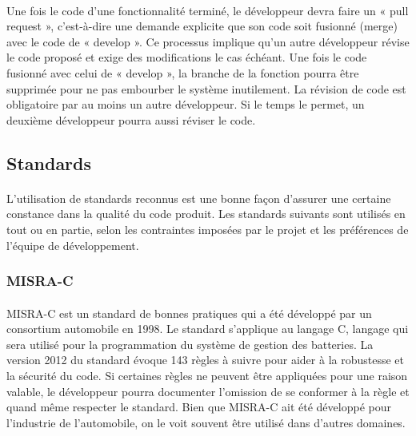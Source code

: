 		\paragraph{}
		Une fois le code d’une fonctionnalité terminé, le développeur devra faire un « pull request », c’est-à-dire une demande explicite que son code soit fusionné (merge) avec le code de « develop ». Ce processus implique qu’un autre développeur révise le code proposé et exige  des modifications le cas échéant. Une fois le code fusionné avec celui de « develop », la branche de la fonction pourra être supprimée pour ne pas embourber le système inutilement. La révision de code est obligatoire par au moins un autre développeur. Si le temps le permet, un deuxième développeur pourra aussi réviser le code.
		
	\subsection{Standards}

		\paragraph{}
		L’utilisation de standards reconnus est une bonne façon d’assurer une certaine constance dans la qualité du code produit. Les standards suivants sont utilisés en tout ou en partie, selon les contraintes imposées par le projet et les préférences de l’équipe de développement.
	
		\subsubsection{MISRA-C}
	
			\paragraph{}
			MISRA-C est un standard de bonnes pratiques qui a été développé par un consortium automobile en 1998. Le standard s’applique au langage C, langage qui sera utilisé pour la programmation du système de gestion des batteries. La version 2012 du standard évoque 143 règles à suivre pour aider à la robustesse et la sécurité du code. Si certaines règles ne peuvent être appliquées pour une raison valable, le développeur pourra documenter l’omission de se conformer à la règle et quand même respecter le standard. Bien que MISRA-C ait été développé pour l’industrie de l’automobile, on le voit souvent être utilisé dans d’autres domaines.
		
